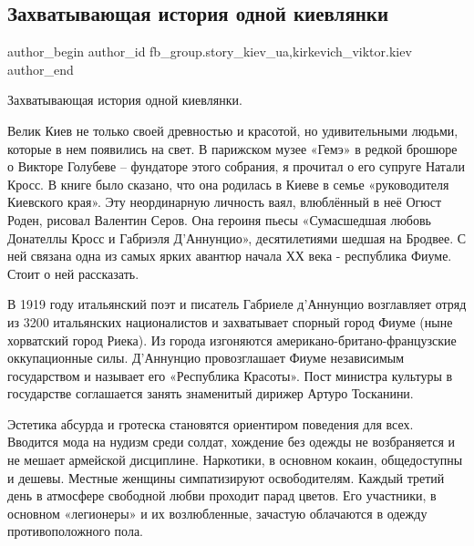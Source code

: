  
 
 
 
 
 
\subsection{Захватывающая история одной киевлянки}
\label{sec:04_01_2022.fb.fb_group.story_kiev_ua.1.istoria_odnoj_kievljanki}
 
\ifcmt
 author_begin
   author_id fb_group.story_kiev_ua,kirkevich_viktor.kiev
 author_end
\fi

Захватывающая история одной киевлянки.

Велик Киев не только своей древностью и красотой, но удивительными людьми,
которые в нем появились на свет. В парижском музее «Гемэ» в редкой брошюре о
Викторе Голубеве – фундаторе этого собрания, я прочитал о его супруге Натали
Кросс. В книге было сказано, что она родилась в Киеве в семье «руководителя
Киевского края». Эту неординарную личность ваял, влюблённый в неё Огюст Роден,
рисовал Валентин Серов. Она героиня пьесы «Сумасшедшая любовь Донателлы Кросс и
Габриэля Д'Аннунцио», десятилетиями шедшая на Бродвее. С ней связана одна из
самых ярких авантюр начала ХХ века - республика Фиуме. Стоит о ней рассказать.

В 1919 году итальянский поэт и писатель Габриеле д’Аннунцио возглавляет отряд
из 3200 итальянских националистов и захватывает спорный город Фиуме (ныне
хорватский город Риека). Из города изгоняются американо-британо-французские
оккупационные силы. Д’Аннунцио провозглашает Фиуме независимым государством и
называет его «Республика Красоты». Пост министра культуры в государстве
соглашается занять знаменитый дирижер Артуро Тосканини.

Эстетика абсурда и гротеска становятся ориентиром поведения для всех. Вводится
мода на нудизм среди солдат, хождение без одежды не возбраняется и не мешает
армейской дисциплине. Наркотики, в основном кокаин, общедоступны и дешевы.
Местные женщины симпатизируют освободителям. Каждый третий день в атмосфере
свободной любви проходит парад цветов. Его участники, в основном «легионеры» и
их возлюбленные, зачастую облачаются в одежду противоположного пола. 

